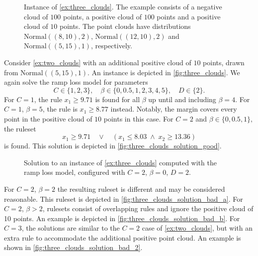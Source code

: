 \begin{example}\label{ex:three_clouds}
    \begin{figure}
        
        \caption{Instance of \autoref{ex:three_clouds}. The example consists of a negative cloud of $100$ points, a positive cloud of $100$ points and a positive cloud of $10$ points.
        The point clouds have distributions $\text{Normal}((8, 10), 2)$, $\text{Normal}((12, 10), 2)$ and $\text{Normal}((5,15), 1)$, respectively.}
        \label{fig:three_clouds}
    \end{figure}
    Consider \autoref{ex:two_clouds} with an additional positive cloud of $10$ points, drawn from $\text{Normal}((5, 15), 1)$.
    An instance is depicted in \autoref{fig:three_clouds}.
    We again solve the ramp loss model for parameters
    \[C \in \{1,2,3\}, \quad \beta \in \{0, 0.5, 1, 2, 3, 4, 5\}, \quad D\in \{2\}.\]
    For $C = 1$, the rule $x_1 \geq 9.71$ is found for all $\beta$ up until and including $\beta = 4$.
    For $C = 1$, $\beta = 5$, the rule is $x_1 \geq 8.77$ instead.
    Notably, the margin covers every point in the positive cloud of $10$ points in this case.
    For $C = 2$ and $\beta \in \{0, 0.5, 1\},$ the ruleset
    \[
        x_1 \geq 9.71 \quad \vee \quad  \left(x_1 \leq 8.03 \; \wedge \; x_2 \geq 13.36\right)
    \]
    is found.
    This solution is depicted in \autoref{fig:three_clouds_solution_good}.
    \begin{figure}
        
        \caption{Solution to an instance of \autoref{ex:three_clouds} computed with the ramp loss model, configured with $C=2$, $\beta=0$, $D=2$.}
        \label{fig:three_clouds_solution_good}
    \end{figure}
    For $C=2$, $\beta=2$ the resulting ruleset is different and may be considered reasonable.
    This ruleset is depicted in \autoref{fig:three_clouds_solution_bad_a}.
    For $C=2$, $\beta>2$, rulesets consist of overlapping rules and ignore the positive cloud of 10 points.
    An example is depicted in \autoref{fig:three_clouds_solution_bad_b}.
    For $C=3$, the solutions are similar to the $C=2$ case of \autoref{ex:two_clouds},
    but with an extra rule to accommodate the additional positive point cloud.
    An example is shown in \autoref{fig:three_clouds_solution_bad_2}.


\end{example}
